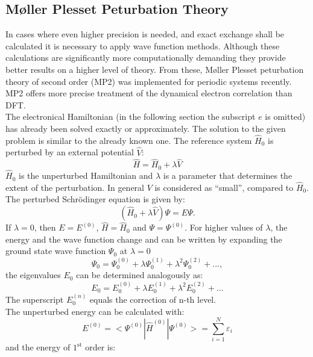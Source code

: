 \documentclass[11pt,DIV=13,BCOR=5mm,a4paper,headinclude]{scrbook}
\begin{document}
\subsection{M\o{}ller Plesset Peturbation Theory}
In cases where even higher precision is needed, and exact exchange shall be calculated it is necessary to apply wave function methods.
Although these calculations are significantly more computationally demanding they provide better results on a higher level of theory.
From these, M\o{}ller Plesset peturbation theory of second order (MP2)\cite{mollerplesset} was implemented for periodic systems recently.
MP2 offers more precise treatment of the dynamical electron correlation than DFT.
\\
The electronical Hamiltonian (in the following section the subscript $e$ is omitted) has already been solved exactly or approximately.
The solution to the given problem is similar to the already known one.
The reference system $\hat{H}_0$ is perturbed by an external potential $\hat{V}$:
\begin{equation}
 \hat{H} = \hat{H}_0 + \lambda \hat{V}
\end{equation}
$\hat{H}_0$ is the unperturbed Hamiltonian and $\lambda$ is a parameter that determines the extent of the perturbation.
In general $V$ is considered as ``small'', compared to $\hat{H}_0$.
The perturbed Schrödinger equation is given by:
\begin{equation}
 (\hat{H}_0 + \lambda \hat{V})\Psi = E\Psi.
\end{equation}
If $\lambda=0$, then $E=E^{(0)}$, $\hat{H} = \hat{H}_0$ and $\Psi=\Psi^{(0)}$.
For higher values of $\lambda$, the energy and the wave function change and can be written by expanding the ground state wave function $\Psi_0$ at $\lambda=0$
\begin{equation}
 \Psi_0 = \Psi_0^{(0)} + \lambda \Psi_0^{(1)} + \lambda^2\Psi_0^{(2)} + ...,
\end{equation}
the eigenvalues $E_0$ can be determined analogously as:
\begin{equation}
 E_0 = E_0^{(0)} + \lambda E_0^{(1)} + \lambda^2E_0^{(2)} + ...
\end{equation}
The superscript $E_0^{(n)}$ equals the correction of n-th level.\\
The unperturbed energy can be calculated with:
\begin{equation}
 E^{(0)} = <\Psi^{(0)}|\hat{H}^{(0)}|\Psi^{(0)}>=\sum\limits_{i=1}^N\varepsilon_i
\end{equation}
and the energy of $1^\textrm{st}$ order is:
\end{document}
